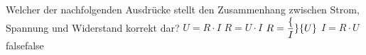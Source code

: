     {Welcher der nachfolgenden Ausdrücke stellt den Zusammenhang zwischen Strom, Spannung und Widerstand korrekt dar?}
    {$U = R \cdot I $}
    {$R = U \cdot I$}
    {$R = \dfrac\{I\}\{U\}$}
    {$I =R \cdot U$}
    {false}{false}